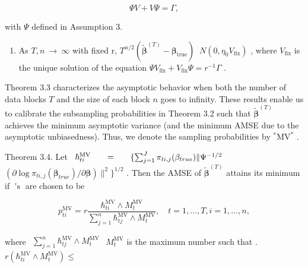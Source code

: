 \documentclass[
  10
]{article}
\providecommand{\tightlist}{%
  \setlength{\itemsep}{0pt}\setlength{\parskip}{0pt}}
\begin{document}
\[
\Psi V + V \Psi = \Gamma ,
\]

with \(\Psi\) defined in Assumption 3.

\begin{enumerate}
\def\labelenumi{\roman{enumi}.}
\setcounter{enumi}{1}
\tightlist
\item
  As \(T , n \ \to \ \infty\) with fixed r,
  \(T ^ { \alpha / 2 } ( \tilde { \pmb \beta } ^ { ( T ) } - { \pmb \beta } _ { \mathrm { t r u e } } ) \ \)
  \(N ( 0 , \eta _ { 0 } V _ { \mathrm { f i x } } )\) , where
  \(V _ { \mathrm { f i x } }\) is the unique solution of the equation
  \(\Psi V _ { \mathrm { f i x } } + V _ { \mathrm { f i x } } \Psi = r ^ { - 1 } \Gamma\)
  .
\end{enumerate}

Theorem 3.3 characterizes the asymptotic behavior when both the number
of data blocks \(T\) and the size of each block \(n\) goes to infinity.
These results enable us to calibrate the subsampling probabilities in
Theorem 3.2 such that \(\tilde { \boldsymbol { \beta } } ^ { ( T ) }\)
achieves the minimum asymptotic variance (and the minimum AMSE due to
the asymptotic unbiasedness). Thus, we denote the sampling probabilities
by \(^ { \ast } \mathrm { { M V } ^ { \ast } }\) .

Theorem 3.4. Let
\(\begin{array} { r l r } { \hbar _ { t i } ^ { \mathrm { M V } } } & { { } } & { = } \end{array} \quad \begin{array} { r l r } { \{ \sum _ { j = 1 } ^ { J } \pi _ { t i , j } ( \beta _ { t r u e } ) \| \Psi ^ { - 1 / 2 } } \end{array}\)
\(( \partial \log \pi _ { t i , j } ( \pmb { \beta } _ { t r u e } ) / \partial \pmb { \beta } ) \| ^ { 2 } \} ^ { 1 / 2 }\)
. Then the AMSE of \(\tilde { \pmb { \beta } } ^ { ( T ) }\) attains its
minimum if \(\mathop { p _ { t i } { ' } s }\) are chosen to be

\[
p _ { t i } ^ { \mathrm { { M V } } } = r \frac { \hbar _ { t i } ^ { \mathrm { { M V } } } \wedge M _ { t } ^ { \mathrm { { M V } } } } { \sum _ { j = 1 } ^ { n } \hbar _ { t j } ^ { \mathrm { { M V } } } \wedge M _ { t } ^ { \mathrm { { M V } } } } , \quad t = 1 , \dots , T , i = 1 , \dots , n ,
\]

where
\(\begin{array} { r } { \sum _ { j = 1 } ^ { n } \hbar _ { t j } ^ { \mathrm { M V } } \wedge M _ { t } ^ { \mathrm { M V } } } \end{array}\)
\(M _ { t } ^ { \mathrm { M V } }\) is the maximum number such that .
\(r ( \hbar _ { t i } ^ { \mathrm { M V } } \wedge M _ { t } ^ { \mathrm { M V } } ) \leq\)
\end{document}
